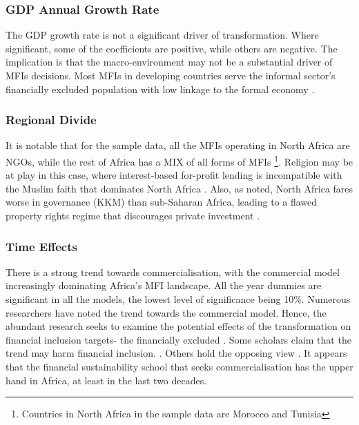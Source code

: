 \documentclass[a4paper,nobind]{templates/ociamthesis}
\begin{document}
\hypertarget{gdp-annual-growth-rate}{%
\subsubsection{GDP Annual Growth Rate}\label{gdp-annual-growth-rate}}

The GDP growth rate is not a significant driver of transformation. Where significant, some of the coefficients are positive, while others are negative. The implication is that the macro-environment may not be a substantial driver of MFIs decisions. Most MFIs in developing countries serve the informal sector's financially excluded population with low linkage to the formal economy \autocite{ghosh2013microfinance}.

\hypertarget{regional-divide}{%
\subsubsection{Regional Divide}\label{regional-divide}}

It is notable that for the sample data, all the MFIs operating in North Africa are NGOs, while the rest of Africa has a MIX of all forms of MFIs \footnote{Countries in North Africa in the sample data are Morocco and Tunisia}. Religion may be at play in this case, where interest-based for-profit lending is incompatible with the Muslim faith that dominates North Africa \autocite{hassan2018religious}. Also, as noted, North Africa fares worse in governance (KKM) than sub-Saharan Africa, leading to a flawed property rights regime that discourages private investment \autocite{johnson2002property,claessens2003financial}.

\hypertarget{time-effects}{%
\subsubsection{Time Effects}\label{time-effects}}

There is a strong trend towards commercialisation, with the commercial model increasingly dominating Africa's MFI landscape. All the year dummies are significant in all the models, the lowest level of significance being 10\%. Numerous researchers have noted the trend towards the commercial model. Hence, the abundant research seeks to examine the potential effects of the transformation on financial inclusion targets- the financially excluded \autocite{d2017ngos}. Some scholars claim that the trend may harm financial inclusion. \autocite{meagher2006microfinance,hartarska2007regulated}. Others hold the opposing view \autocite{duvendack2015mis}. It appears that the financial sustainability school that seeks commercialisation has the upper hand in Africa, at least in the last two decades.
\end{document}
